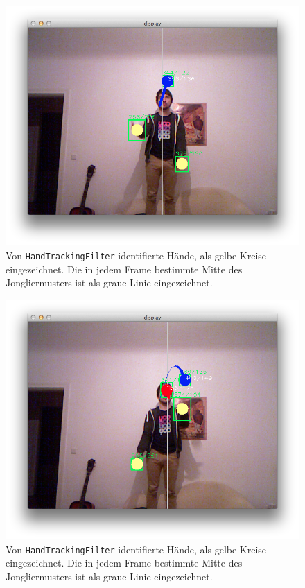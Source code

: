 \documentclass[12pt,a4paper,ngerman]{scrartcl}
\begin{document}
\begin{figure}[H]
    \centering
    \includegraphics[scale=0.45]{img/handtracking-1.png}
    \vspace{-0.5cm}
    \caption{Von \lstinline{HandTrackingFilter} identifierte Hände, als gelbe Kreise eingezeichnet. Die in jedem Frame bestimmte Mitte des Jongliermusters ist als graue Linie eingezeichnet.}
    \label{rects-1}
\end{figure}

\begin{figure}[H]
    \centering
    \includegraphics[scale=0.45]{img/handtracking-2.png}
    \vspace{-0.5cm}
    \caption{Von \lstinline{HandTrackingFilter} identifierte Hände, als gelbe Kreise eingezeichnet. Die in jedem Frame bestimmte Mitte des Jongliermusters ist als graue Linie eingezeichnet.}
    \label{rects-1}
\end{figure}
\end{document}
